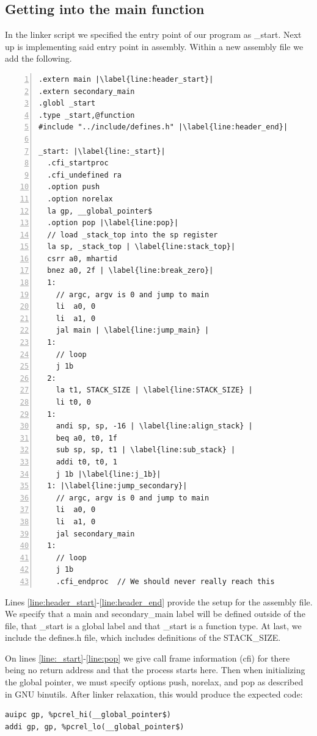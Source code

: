 \subsection{Getting into the main function}\label{sec:get_main}
In the linker script we specified the entry point of our program as \_start.
Next up is implementing said entry point in assembly. Within a new assembly file
we add the following.
\begin{lstlisting}[numbers=left, escapechar=|, caption=Assembly code for getting
to main function.]
.extern main |\label{line:header_start}|
.extern secondary_main
.globl _start
.type _start,@function
#include "../include/defines.h" |\label{line:header_end}|

_start: |\label{line:_start}|
  .cfi_startproc
  .cfi_undefined ra
  .option push
  .option norelax
  la gp, __global_pointer$
  .option pop |\label{line:pop}|
  // load _stack_top into the sp register
  la sp, _stack_top | \label{line:stack_top}|
  csrr a0, mhartid
  bnez a0, 2f | \label{line:break_zero}|
  1:
    // argc, argv is 0 and jump to main
    li  a0, 0
    li  a1, 0
    jal main | \label{line:jump_main} |
  1:
    // loop
    j 1b
  2:
    la t1, STACK_SIZE | \label{line:STACK_SIZE} |
    li t0, 0
  1:
    andi sp, sp, -16 | \label{line:align_stack} |
    beq a0, t0, 1f
    sub sp, sp, t1 | \label{line:sub_stack} |
    addi t0, t0, 1
    j 1b |\label{line:j_1b}|
  1: |\label{line:jump_secondary}|
    // argc, argv is 0 and jump to main
    li  a0, 0
    li  a1, 0
    jal secondary_main
  1:
    // loop
    j 1b
    .cfi_endproc  // We should never really reach this
\end{lstlisting}
Lines \ref{line:header_start}-\ref{line:header_end} provide the setup for the
assembly file. We specify that a main and secondary\_main label will be defined
outside of the file, that \_start is a global label and that \_start is a
function type. At last, we include the defines.h file, which includes
definitions of the STACK\_SIZE.

On lines \ref{line:_start}-\ref{line:pop} we give call frame information (cfi)
for there being no return address and that the process starts here. Then when
initializing the global pointer, we must specify options push, norelax, and pop
as described in GNU binutils. \cite{GNU_bin} After linker relaxation, this would
produce the expected code:
\begin{lstlisting}
auipc gp, %pcrel_hi(__global_pointer$)
addi gp, gp, %pcrel_lo(__global_pointer$)
\end{lstlisting}

